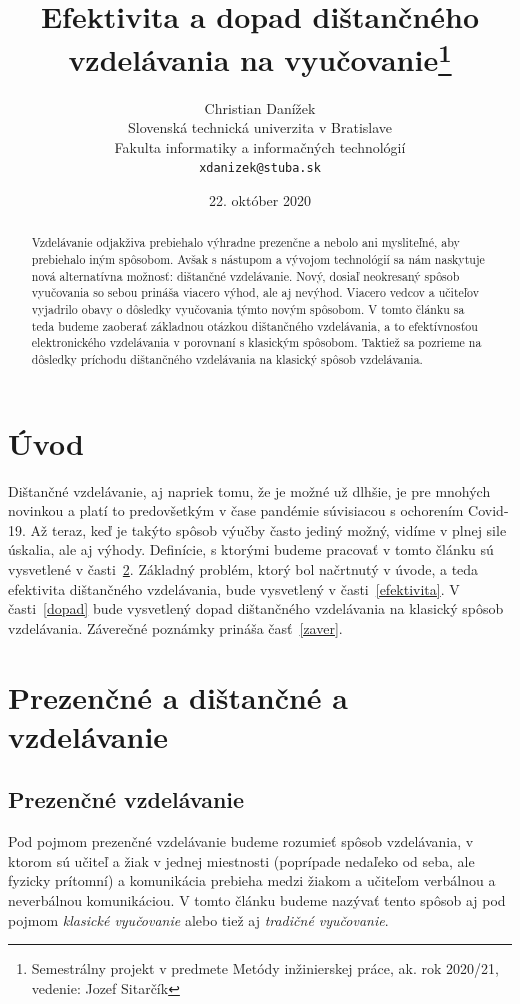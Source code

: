 \documentclass[10pt,twoside,slovak,a4paper]{article}
\title{Efektivita a dopad dištančného vzdelávania na vyučovanie\thanks{Semestrálny projekt v predmete Metódy inžinierskej práce, ak. rok 2020/21, vedenie: Jozef Sitarčík}}
\author{Christian Danížek\\[2pt]
	{\small Slovenská technická univerzita v Bratislave}\\
	{\small Fakulta informatiky a informačných technológií}\\
	{\small \texttt{xdanizek@stuba.sk}}
	}
\date{\small 22. október 2020} %
\begin{document}
\maketitle


\begin{abstract}
Vzdelávanie odjakživa prebiehalo výhradne prezenčne a  nebolo ani mysliteľné, aby prebiehalo iným spôsobom. Avšak s nástupom a vývojom technológií sa nám naskytuje nová alternatívna možnosť: dištančné vzdelávanie. Nový, dosiaľ neokresaný spôsob vyučovania so sebou prináša viacero výhod, ale aj nevýhod. Viacero vedcov a učiteľov vyjadrilo obavy o dôsledky vyučovania týmto novým spôsobom. V tomto článku sa teda budeme zaoberať základnou otázkou dištančného vzdelávania, a to efektívnosťou elektronického vzdelávania v porovnaní s klasickým spôsobom. Taktiež sa pozrieme na dôsledky príchodu dištančného vzdelávania na klasický spôsob vzdelávania.
\end{abstract}

\section{Úvod}
Dištančné vzdelávanie, aj napriek tomu, že je možné už dlhšie, je pre mnohých novinkou a platí to predovšetkým v čase pandémie súvisiacou s ochorením Covid-19. Až teraz, keď je takýto spôsob výučby často jediný možný, vidíme v plnej sile úskalia, ale aj výhody\cite{Zimmerman:Experiment}. Definície, s ktorými budeme pracovať v tomto článku sú vysvetlené v časti~\ref{definicie}. Základný problém, ktorý bol načrtnutý v úvode, a teda efektivita dištančného vzdelávania, bude vysvetlený v časti~\ref{efektivita}. V časti~\ref{dopad} bude vysvetlený dopad dištančného vzdelávania na klasický spôsob vzdelávania. Záverečné poznámky prináša časť~\ref{zaver}.

\section{Prezenčné a dištančné a vzdelávanie} \label{definicie}
\subsection{Prezenčné vzdelávanie}
Pod pojmom prezenčné vzdelávanie budeme rozumieť spôsob vzdelávania, v ktorom sú učiteľ a žiak v jednej miestnosti (poprípade nedaľeko od seba, ale fyzicky prítomní) a komunikácia prebieha medzi žiakom a učiteľom verbálnou a neverbálnou komunikáciou. V tomto článku budeme nazývať tento spôsob aj pod pojmom \textit{klasické vyučovanie} alebo tiež aj \textit{tradičné vyučovanie}.
\end{document}
